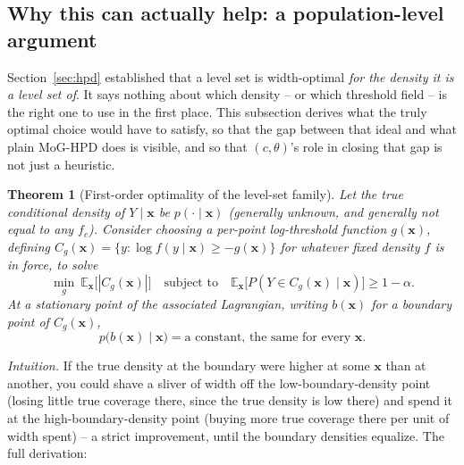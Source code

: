 \documentclass[11pt]{article}
\newtheorem{theorem}{Theorem}[section]
\begin{document}
\subsection{Why this can actually help: a population-level argument}
\label{sec:optimality}

Section~\ref{sec:hpd} established that a level set is width-optimal \emph{for the density it is a
level set of}. It says nothing about which density -- or which threshold field -- is the right
one to use in the first place. This subsection derives what the truly optimal choice would have to
satisfy, so that the gap between that ideal and what plain MoG-HPD does is visible, and so that
$(c,\theta)$'s role in closing that gap is not just a heuristic.

\begin{theorem}[First-order optimality of the level-set family]
\label{thm:optimality}
Let the true conditional density of $Y\mid\bm x$ be $p(\cdot\mid\bm x)$ (generally unknown, and
generally not equal to any $f_c$). Consider choosing a per-point log-threshold function $g(\bm x)$,
defining $C_g(\bm x) = \{y : \log f(y\mid\bm x) \ge -g(\bm x)\}$ for whatever fixed density $f$ is
in force, to solve
\[
\min_g\ \mathbb E_{\bm x}\big[|C_g(\bm x)|\big] \quad\text{subject to}\quad
\mathbb E_{\bm x}\big[P(Y\in C_g(\bm x)\mid \bm x)\big] \ge 1-\alpha.
\]
At a stationary point of the associated Lagrangian, writing $b(\bm x)$ for a boundary point of
$C_g(\bm x)$,
\begin{equation}
p\big(b(\bm x)\mid\bm x\big) = \text{a constant, the same for every } \bm x.
\label{eq:optcond}
\end{equation}
\end{theorem}
\emph{Intuition.} If the true density at the boundary were higher at some $\bm x$ than at another,
you could shave a sliver of width off the low-boundary-density point (losing little true coverage
there, since the true density is low there) and spend it at the high-boundary-density point
(buying more true coverage there per unit of width spent) -- a strict improvement, until the
boundary densities equalize. The full derivation:
\end{document}
